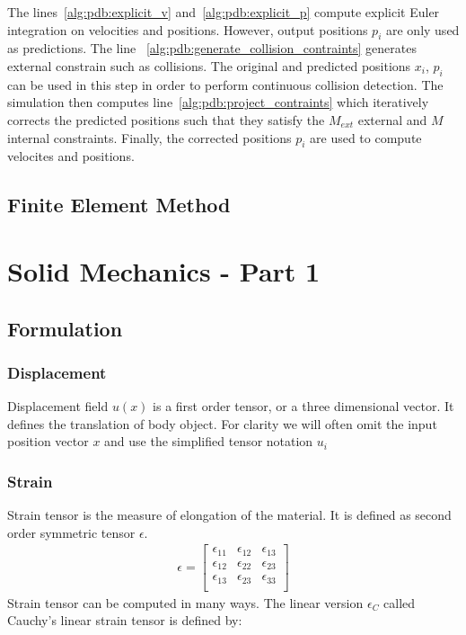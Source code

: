 \documentclass[en]{minipw} %
\begin{document}
The lines~\ref{alg:pdb:explicit_v} and~\ref{alg:pdb:explicit_p} compute explicit Euler integration on velocities and positions. However, output positions $p_i$ are only used as predictions. 
The line ~\ref{alg:pdb:generate_collision_contraints} generates external constrain such as collisions. The original and predicted positions $x_i$, $p_i$ can be used in this step in order to perform continuous collision detection.
The simulation then computes line~\ref{alg:pdb:project_contraints} which iteratively corrects the predicted positions such that they satisfy the $M_{ext}$ external and $M$ internal constraints.
Finally, the corrected positions $p_i$ are used to compute velocites and positions.

\section{Finite Element Method}

\chapter{Solid Mechanics - Part 1}
\label{chap:solid_mechanics1}

\section{Formulation}

\subsection{Displacement}
Displacement field $u(x)$ is a first order tensor, or a three dimensional vector. It defines the translation of body object. For clarity we will often omit the input position vector $x$ and use the simplified tensor notation $u_i$

\subsection{Strain}
Strain tensor is the measure of elongation of the material. It is defined as second order symmetric tensor $\epsilon$.
\begin{equation}
\begin{aligned}
\epsilon =
\begin{bmatrix}
\epsilon_{11} & \epsilon_{12} & \epsilon_{13} \\
\epsilon_{12} & \epsilon_{22} & \epsilon_{23} \\
\epsilon_{13} & \epsilon_{23} & \epsilon_{33} \\
\end{bmatrix}
\end{aligned}
\end{equation}
Strain tensor can be computed in many ways. The linear version $\epsilon_C$ called Cauchy's linear strain tensor is defined by:
\end{document}
